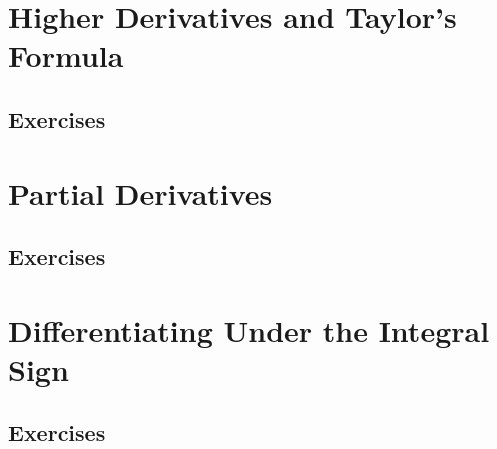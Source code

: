 \section{Higher Derivatives and Taylor's Formula}\label{sec:17.6}	
\subsection*{Exercises}\label{sec:17.6_Exercises}
\section{Partial Derivatives}\label{sec:17.7}	
\subsection*{Exercises}\label{sec:17.7_Exercises}
\section{Differentiating Under the Integral Sign}\label{sec:17.8}	
\subsection*{Exercises}\label{sec:17.8_Exercises}
